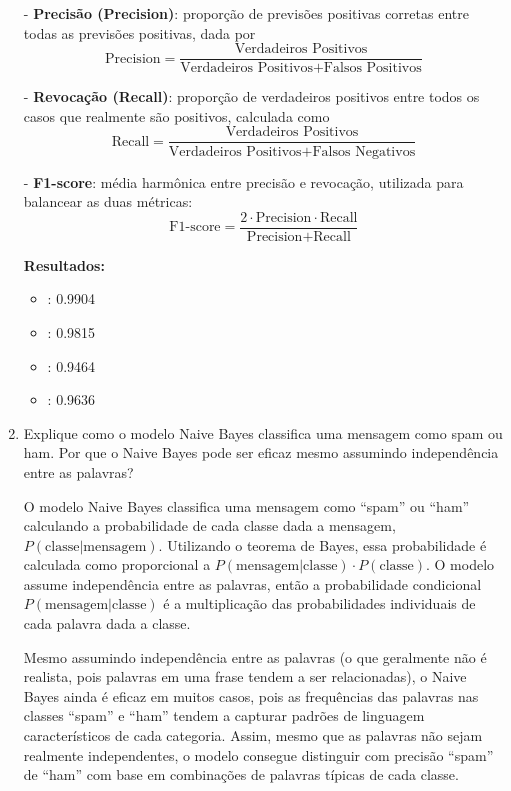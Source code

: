 \begin{enumerate}
\begin{tcolorbox}[title=Resposta:]
        - \textbf{Precisão (Precision)}: proporção de previsões positivas corretas entre todas as previsões positivas, dada por
        \[
        \text{Precision} = \frac{\text{Verdadeiros Positivos}}{\text{Verdadeiros Positivos} + \text{Falsos Positivos}}
        \]
        
        - \textbf{Revocação (Recall)}: proporção de verdadeiros positivos entre todos os casos que realmente são positivos, calculada como 
        \[
        \text{Recall} = \frac{\text{Verdadeiros Positivos}}{\text{Verdadeiros Positivos} + \text{Falsos Negativos}}
        \]
        
        - \textbf{F1-score}: média harmônica entre precisão e revocação, utilizada para balancear as duas métricas:
        \[
        \text{F1-score} = \frac{2 \cdot \text{Precision} \cdot \text{Recall}}{\text{Precision} + \text{Recall}}
        \]
        
        \textbf{Resultados:}
        \begin{itemize}
            \item {}: 0.9904
            \item {}: 0.9815
            \item {}: 0.9464
            \item {}: 0.9636
        \end{itemize}
        \end{tcolorbox}
    
    \newpage
    \item Explique como o modelo Naive Bayes classifica uma mensagem como spam ou ham. Por que o Naive Bayes pode ser eficaz mesmo assumindo independência entre as palavras?
    \begin{tcolorbox}[title=Resposta:]
        O modelo Naive Bayes classifica uma mensagem como ``spam'' ou ``ham'' calculando a probabilidade de cada classe dada a mensagem, \(P(\text{classe} | \text{mensagem})\). Utilizando o teorema de Bayes, essa probabilidade é calculada como proporcional a \(P(\text{mensagem} | \text{classe}) \cdot P(\text{classe})\). O modelo assume independência entre as palavras, então a probabilidade condicional \(P(\text{mensagem} | \text{classe})\) é a multiplicação das probabilidades individuais de cada palavra dada a classe.
        
        Mesmo assumindo independência entre as palavras (o que geralmente não é realista, pois palavras em uma frase tendem a ser relacionadas), o Naive Bayes ainda é eficaz em muitos casos, pois as frequências das palavras nas classes ``spam'' e ``ham'' tendem a capturar padrões de linguagem característicos de cada categoria. Assim, mesmo que as palavras não sejam realmente independentes, o modelo consegue distinguir com precisão ``spam'' de ``ham'' com base em combinações de palavras típicas de cada classe.
        \end{tcolorbox}
        

\end{enumerate}
